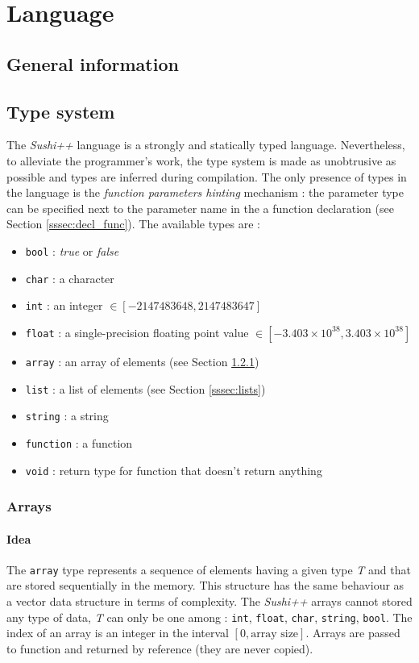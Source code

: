 \documentclass[a4paper,11pt]{article}
\begin{document}
\section{Language}
\label{sec:language}
\subsection{General information}
\subsection{Type system}
\label{ssec:types_s}
The \textit{Sushi++} language is a strongly and statically typed language. Nevertheless, to alleviate the programmer's work, the type system is made as unobtrusive as possible and types are inferred during compilation. The only presence of types in the language is the \textit{function parameters hinting} mechanism : the parameter type can be specified next to the parameter name in the a function declaration (see Section \ref{sssec:decl_func}). The available types are :

\begin{itemize}
	\item \texttt{bool} : \textit{true} or \textit{false}
	\item \texttt{char} : a character
	\item \texttt{int} : an integer $\in [-2147483648, 2147483647]$
	\item \texttt{float} : a single-precision floating point value $\in [-3.403 \times 10^{38},  3.403 \times 10^{38}] $
	\item \texttt{array} : an array of elements (see Section \ref{sssec:arrays})
	\item \texttt{list} : a list of elements (see Section \ref{sssec:lists})
	\item \texttt{string} : a string
	\item \texttt{function} : a function
	\item \texttt{void} : return type for function that doesn't return anything
\end{itemize}
\subsubsection{Arrays}
\label{sssec:arrays}
\paragraph{Idea}
The \texttt{array} type represents a sequence of elements having a given type \textit{T} and that are stored sequentially in the memory. This structure has the same behaviour as a vector data structure in terms of complexity. The \textit{Sushi++} arrays cannot stored any type of data, \textit{T} can only be one among : \texttt{int}, \texttt{float}, \texttt{char}, \texttt{string}, \texttt{bool}. The index of an array is an integer in the interval $[0, \text{array size}]$. Arrays are passed to function and returned by reference (they are never copied).
\end{document}
